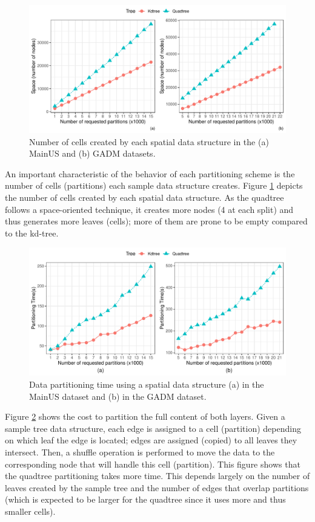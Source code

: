  \begin{figure}
    \centering
    \includegraphics[width=\textwidth]{chapterExtension/K/K_Space} 
    \caption{Number of cells created by each spatial data structure in the (a) MainUS and (b) GADM datasets.} \label{fig:k_space_us}
 \end{figure}

 An important characteristic of the behavior of each partitioning scheme is the number of cells (partitions) each sample data structure creates. Figure \ref{fig:k_space_us} depicts the number of cells created by each spatial data structure. As the quadtree follows a space-oriented technique, it creates more nodes (4 at each split) and thus generates more leaves (cells); more of them are prone to be empty compared to the kd-tree.

 \begin{figure}
    \centering
    \includegraphics[width=\textwidth]{chapterExtension/K/K_Partitioning} 
    \caption{Data partitioning time using a spatial data structure (a) in the MainUS dataset and (b) in the GADM dataset.} \label{fig:k_partitioning_us}
 \end{figure}

 Figure \ref{fig:k_partitioning_us} shows the cost to partition the full content of both layers. Given a sample tree data structure, each edge is assigned to a cell (partition) depending on which leaf the edge is located; edges are assigned (copied) to all leaves they intersect. Then, a shuffle operation is performed to move the data to the corresponding node that will handle this cell (partition). This figure shows that the quadtree partitioning takes more time. This depends largely on the number of leaves created by the sample tree and the number of edges that overlap partitions (which is expected to be larger for the quadtree since it uses more and thus smaller cells).

